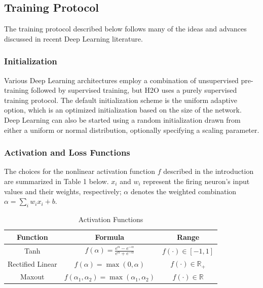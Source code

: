 \newpage
\subsection{Training Protocol} 
The training protocol described below follows many of the ideas and advances discussed in recent Deep Learning literature.

\subsubsection{Initialization}
\label{sssec:Initialization}

Various Deep Learning architectures employ a combination of unsupervised pre-training followed by supervised training, but H2O uses a purely supervised training protocol. The default initialization scheme is the uniform adaptive option, which is an optimized initialization based on the size of the network. Deep Learning can also be started using a random initialization drawn from either a uniform or normal distribution, optionally specifying a scaling parameter. \nowidow[6]


\subsubsection{Activation and Loss Functions} \label{sssec:ActivationLoss}
The choices for the nonlinear activation function $f$ described in the introduction are summarized in Table 1 below. $x_i$ and $w_i$ represent the firing neuron's input values and their weights, respectively; $\alpha$ denotes the weighted combination $\alpha = \sum_i w_i x_i+b$.

\begin{table}[ht] 
\caption{Activation Functions }
\smallskip
\centering %
\begin{tabular}{c c c} %
\hline\hline %
Function & Formula & Range \\ [0.5ex] %
\hline %
Tanh & $f(\alpha) = \frac{e^{\alpha} - e ^{-\alpha}}{e^\alpha + e ^{-\alpha}}$ & $f(\cdot) \in [-1,1]$ \\ %
Rectified Linear & $f(\alpha) = \max(0,\alpha)$ & $f(\cdot) \in \mathbb{R}_+$ \\
Maxout & $f(\alpha_1,\alpha_2) = \max(\alpha_1,\alpha_2) $ & $f(\cdot) \in \mathbb{R}$\\  %
\hline %
\end{tabular} 
\label{table:ActivationFunctions} %
\end{table}

